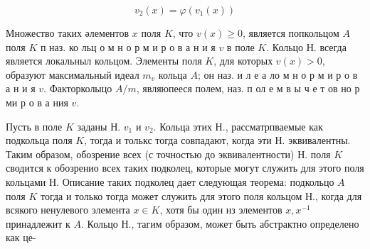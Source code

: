 \documentclass[10pt]{article}
\begin{document}
\[

v_{2}(x)=\varphi\left(v_{1}(x)\right)

\]



Множество таких әлементов $x$ поля $K$, что $v(x) \geqslant 0$, является попкольцом $A$ поля $K$ п наз. ко льц о м н о р м и р о в а н и я $v$ в поле $K$. Кольцо Н. всегда является локальныл кольцом. Элементы поля $K$, для которых $v(x)>0$, образуют максимальный идеал $m_{v}$ кольца $A$; он наз. и л е а ло м н о р м и р о в а н и я $v$. Факторколыцо $A / m$, являюпееся полем, наз. п ол е м в ы ч е т ов но р ми р о в а ния $v$.



Пусть в поле $K$ заданы Н. $v_{1}$ и $v_{2}$. Кольца этих Н., рассматрпваемые как подкольца поля $K$, тогда и толькс тогда совпадают, когда эти Н. эквивалентны. Таким образом, обозрение всех (с точностью до эквивалентности) Н. поля $K$ сводится к обозренио всех таких подколец, которые могут служить для этого поля кольцами Н. Описание таких подколец дает следующая теорема: подкольцо $A$ поля $K$ тогда и только тогда может служить для этого поля кольцом Н., когда для всякого ненулевого элемента $x \in K$, хотя бы один нз элементов $x, x^{-1}$ принадлежит к $A$. Кольцо Н., тагим образом, может быть абстрактно определено как це-
\end{document}
